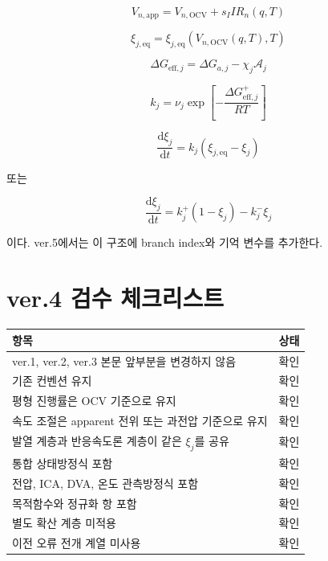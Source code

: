 \documentclass[11pt,a4paper]{article}
\newcommand{\dd}{\mathrm{d}}
\newcommand{\OCV}{\mathrm{OCV}}
\newcommand{\app}{\mathrm{app}}
\newcommand{\eff}{\mathrm{eff}}
\newcommand{\eq}{\mathrm{eq}}
\begin{document}
\begin{equation}
V_{n,\app}=V_{n,\OCV}+s_IIR_n(q,T)
\end{equation}

\begin{equation}
\xi_{j,\eq}=\xi_{j,\eq}\!\left(V_{n,\OCV}(q,T),T\right)
\end{equation}

\begin{equation}
\Delta G_{\eff,j}=\Delta G_{a,j}-\chi_j\mathcal A_j
\end{equation}

\begin{equation}
k_j=\nu_j\exp\left[-\frac{\Delta G_{\eff,j}^{+}}{RT}\right]
\end{equation}

\begin{equation}
\frac{\dd\xi_j}{\dd t}=k_j(\xi_{j,\eq}-\xi_j)
\end{equation}

또는

\begin{equation}
\frac{\dd\xi_j}{\dd t}=k_j^+(1-\xi_j)-k_j^-\xi_j
\end{equation}

이다. ver.5에서는 이 구조에 branch index와 기억 변수를 추가한다.

\section{ver.4 검수 체크리스트}
\begin{longtable}{p{}p{}}
\toprule
항목 & 상태 \\
\midrule
\endhead
ver.1, ver.2, ver.3 본문 앞부분을 변경하지 않음 & 확인 \\
기존 컨벤션 유지 & 확인 \\
평형 진행률은 OCV 기준으로 유지 & 확인 \\
속도 조절은 apparent 전위 또는 과전압 기준으로 유지 & 확인 \\
발열 계층과 반응속도론 계층이 같은 \(\xi_j\)를 공유 & 확인 \\
통합 상태방정식 포함 & 확인 \\
전압, ICA, DVA, 온도 관측방정식 포함 & 확인 \\
목적함수와 정규화 항 포함 & 확인 \\
별도 확산 계층 미적용 & 확인 \\
이전 오류 전개 계열 미사용 & 확인 \\
\bottomrule
\end{longtable}
\end{document}
